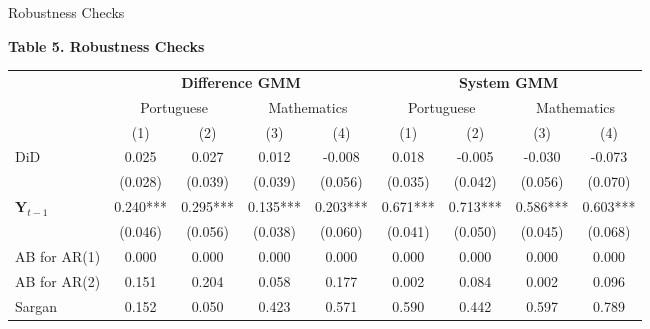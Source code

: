 \documentclass{beamer}
\begin{document}
\begin{frame} {Robustness Checks}
\begin{table}[h]                                    \label{table:Robustness}                        \centering            \textbf{Table 5. Robustness Checks} \\             
\vspace{5pt}
\begin{adjustbox}{max width=\textwidth}           
\begin{tabular}{@{\extracolsep{4pt}}l*{8}{c}@{}}             \toprule             & \multicolumn{4}{c}{\textbf{Difference GMM}} &            \multicolumn{4}{c}{\textbf{System GMM}}  \\            \cline{2-5}              \cline{6-9}                   & \multicolumn{2}{c}{Portuguese} &                    \multicolumn{2}{c}{Mathematics} &                    \multicolumn{2}{c}{Portuguese} &            \multicolumn{2}{c}{Mathematics}  \\            \cline{2-3}                    \cline{4-5}                    \cline{6-7}            \cline{8-9}        
                    &         (1)   &         (2)   &         (3)   &         (4)   &         (1)   &         (2)   &         (3)   &         (4)   \\
\hline
DiD                 &    0.025     &   0.027      &   0.012     &       -0.008 &   0.018     &    -0.005     &   -0.030      &  -0.073       \\
                    &  (0.028)      &   (0.039)     &   (0.039)     &    (0.056)    & (0.035)   &   (0.042)    &   (0.056)     &      (0.070) \\
$\mathbf{Y}_{t-1}$              &  0.240***    &  0.295***     &              0.135*** &       0.203***        &  0.671***     & 0.713***      &              0.586*** &     0.603***       \\
                    &  (0.046)      &   (0.056)     &    (0.038)        & (0.060)  &   (0.041)     &   (0.050)     &    (0.045)         &            (0.068) \\
\hline 
AB for AR(1)  &        0.000       &      0.000         &              0.000 & 0.000    &             0.000 &        0.000       &             0.000 &             0.000           \\
AB for AR(2) &      0.151         &    0.204         &              0.058 & 0.177   &  0.002   &   0.084           &       0.002        &       0.096        \\
Sargan              &     0.152          &       0.050        &             0.423  &      0.571         &       0.590        &       0.442        &     0.597          &    0.789           \\                    

\end{tabular}
\end{adjustbox}
\end{table}
\end{frame}
\end{document}
